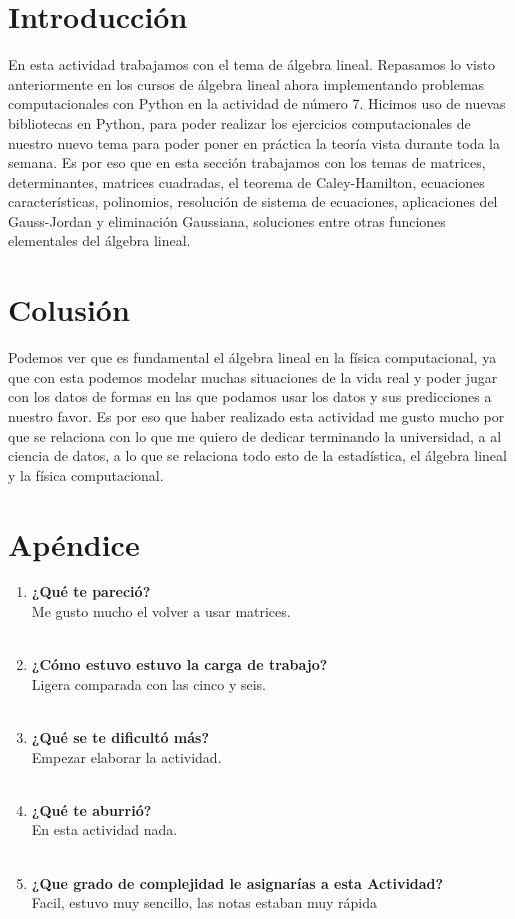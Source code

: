 \documentclass{article}
\begin{document}
\section{\LARGE Introducción}
En esta actividad trabajamos con el tema de álgebra lineal. Repasamos lo visto anteriormente en los cursos de álgebra lineal ahora implementando problemas computacionales con Python en la actividad de número 7. Hicimos uso de nuevas bibliotecas en Python, para poder realizar los ejercicios computacionales de nuestro nuevo tema para poder poner en práctica la teoría vista durante toda la semana. Es por eso que en esta sección trabajamos con los temas de matrices, determinantes, matrices cuadradas, el teorema de Caley-Hamilton, ecuaciones características, polinomios, resolución de sistema de ecuaciones, aplicaciones del Gauss-Jordan y eliminación Gaussiana, soluciones entre otras funciones elementales del álgebra lineal.
\large\textbf{}  

 \section{\LARGE Colusión}
 Podemos ver que es fundamental el álgebra lineal en la física computacional, ya que con esta podemos modelar muchas situaciones de la vida real y poder jugar con los datos de formas en las que podamos usar los datos y sus predicciones a nuestro favor. Es por eso que haber realizado esta actividad me gusto mucho por que se relaciona con lo que me quiero de dedicar terminando la universidad, a al ciencia de datos, a lo que se relaciona todo esto de la estadística, el álgebra lineal y la física computacional.
 \large\textbf{}
 
 \section{\LARGE Apéndice }
 
 \begin{enumerate}
     \item\large\textbf{¿Qué te pareció?}
     \\Me gusto mucho el volver a usar matrices.
 \\
 \\
    \item\large\textbf{¿Cómo estuvo estuvo la carga de trabajo?}
    \\Ligera comparada con las cinco y seis.
 \\
 \\
    \item\large\textbf{¿Qué se te dificultó más?} 
    \\ Empezar elaborar la actividad.
 \\
 \\
    \item\large\textbf{¿Qué te aburrió?}
    \\En esta actividad nada.
 \\
 \\

    \item\large\textbf{¿Que grado de complejidad le asignarías a esta Actividad?}
    \\Facil, estuvo muy sencillo, las notas estaban muy rápida
 \end{enumerate}
 
\end{document}
